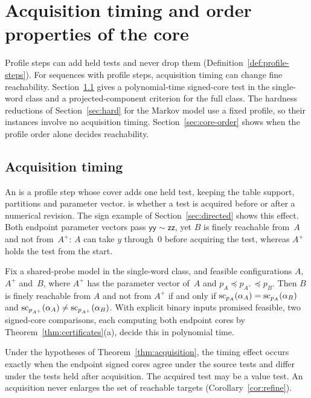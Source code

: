 
\section{Acquisition timing and order properties of the core}\label{sec:timing}

Profile steps can add held tests and never drop them
(Definition~\ref{def:profile-steps}). For sequences with profile steps,
acquisition timing can change fine reachability.
Section~\ref{sec:acquisition} gives a polynomial-time signed-core test in
the single-word class and a projected-component criterion for the full
class.
The hardness reductions of Section~\ref{sec:hard} for the Markov model use
a fixed profile, so their instances involve no acquisition timing.
Section~\ref{sec:core-order} shows when the profile order alone decides
reachability.

\subsection{Acquisition timing}\label{sec:acquisition}

An  is a profile step whose cover adds one held test,
keeping the table support, partitions and parameter vector.
 is whether a test is acquired before or after
a numerical revision. The sign example of Section~\ref{sec:directed}
shows this effect.
Both endpoint parameter vectors pass $\mathsf{yy}\sim\mathsf{zz}$, yet $B$
is finely reachable from~$A$ and not from~$A^+$: $A$ can take $y$
through~$0$ before acquiring the test, whereas $A^+$ holds the test from
the start.

\begin{theorem}\label{thm:acquisition}
Fix a shared-probe model in the single-word class, and feasible
configurations $A$, $A^+$ and~$B$, where $A^+$ has the parameter vector
of~$A$ and $p_A\preceq p_{A^+}\preceq p_B$. Then $B$ is finely reachable
from $A$ and not from $A^+$ if and only if
$\operatorname{sc}_{p_A}(\alpha_A)=\operatorname{sc}_{p_A}(\alpha_B)$ and
$\operatorname{sc}_{p_{A^+}}(\alpha_A)\neq\operatorname{sc}_{p_{A^+}}(\alpha_B)$. With explicit binary
inputs promised feasible, two signed-core comparisons, each computing both
endpoint cores by Theorem~\ref{thm:certificates}(a), decide this in
polynomial time.
\end{theorem}

Under the hypotheses of Theorem~\ref{thm:acquisition}, the timing effect
occurs exactly when the endpoint signed cores agree under the source tests
and differ under the tests held after acquisition. The acquired test may be a value test. An acquisition never enlarges the set of reachable targets
(Corollary~\ref{cor:refine}).

